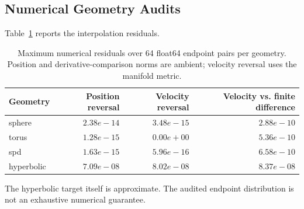 \subsection{Numerical Geometry Audits}
Table~\ref{tab:geometry-audit} reports the interpolation residuals.
\begin{table}[t]\caption{Maximum numerical residuals over 64 float64 endpoint pairs per geometry. Position and derivative-comparison norms are ambient; velocity reversal uses the manifold metric.}\label{tab:geometry-audit}\centering\small\begin{tabular}{@{}lrrr@{}}\toprule
Geometry & Position reversal & Velocity reversal & Velocity vs. finite difference \\
\midrule
sphere & $2.38e-14$ & $3.48e-15$ & $2.88e-10$ \\
torus & $1.28e-15$ & $0.00e+00$ & $5.36e-10$ \\
spd & $1.63e-15$ & $5.96e-16$ & $6.58e-10$ \\
hyperbolic & $7.09e-08$ & $8.02e-08$ & $8.37e-08$ \\
\bottomrule\end{tabular}\end{table}
The hyperbolic target itself is approximate. The audited endpoint distribution is not an exhaustive numerical guarantee.
